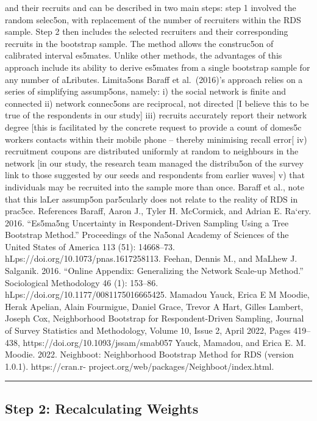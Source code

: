 \documentclass[
  12pt,
  letterpaper,
  DIV=11,
  numbers=noendperiod]{scrartcl}
\theoremstyle{plain}
\theoremstyle{definition}
\begin{document}
and their recruits and can be described in two main steps: step 1
involved the random selec5on, with replacement of the number of
recruiters within the RDS sample. Step 2 then includes the selected
recruiters and their corresponding recruits in the bootstrap sample. The
method allows the construc5on of calibrated interval es5mates. Unlike
other methods, the advantages of this approach include its ability to
derive es5mates from a single bootstrap sample for any number of
aLributes. Limita5ons Baraﬀ et al.~(2016)'s approach relies on a series
of simplifying assump5ons, namely: i) the social network is finite and
connected ii) network connec5ons are reciprocal, not directed {[}I
believe this to be true of the respondents in our study{]} iii) recruits
accurately report their network degree {[}this is facilitated by the
concrete request to provide a count of domes5c workers contacts within
their mobile phone -- thereby minimising recall error{[} iv) recruitment
coupons are distributed uniformly at random to neighbours in the network
{[}in our study, the research team managed the distribu5on of the survey
link to those suggested by our seeds and respondents from earlier
waves{]} v) that individuals may be recruited into the sample more than
once. Baraﬀ et al., note that this laLer assump5on par5cularly does not
relate to the reality of RDS in prac5ce. References Baraﬀ, Aaron J.,
Tyler H. McCormick, and Adrian E. Ra`ery. 2016. ``Es5ma5ng Uncertainty
in Respondent-Driven Sampling Using a Tree Bootstrap Method.''
Proceedings of the Na5onal Academy of Sciences of the United States of
America 113 (51): 14668--73. hLps://doi.org/10.1073/pnas.1617258113.
Feehan, Dennis M., and MaLhew J. Salganik. 2016. ``Online Appendix:
Generalizing the Network Scale-up Method.'' Sociological Methodology 46
(1): 153--86. hLps://doi.org/10.1177/0081175016665425. Mamadou Yauck,
Erica E M Moodie, Herak Apelian, Alain Fourmigue, Daniel Grace, Trevor A
Hart, Gilles Lambert, Joseph Cox, Neighborhood Bootstrap for
Respondent-Driven Sampling, Journal of Survey Statistics and
Methodology, Volume 10, Issue 2, April 2022, Pages 419--438,
https://doi.org/10.1093/jssam/smab057 Yauck, Mamadou, and Erica E. M.
Moodie. 2022. Neighboot: Neighborhood Bootstrap Method for RDS (version
1.0.1). https://cran.r- project.org/web/packages/Neighboot/index.html.

\begin{center}\rule{0.5\linewidth}{0.5pt}\end{center}

\subsection{Step 2: Recalculating
Weights}\label{step-2-recalculating-weights}
\end{document}
